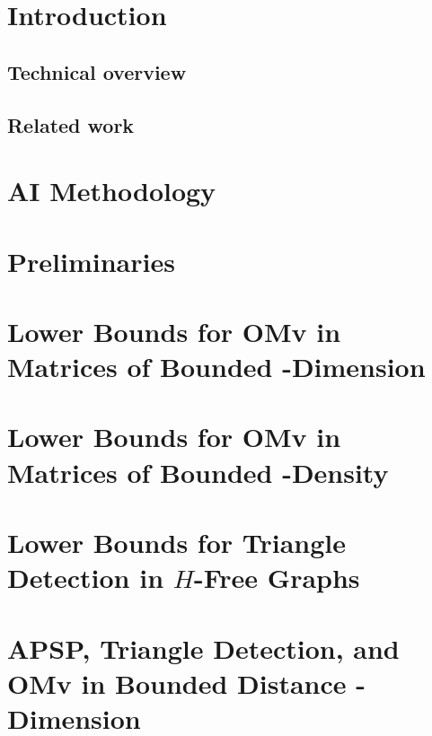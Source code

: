 \documentclass[11pt]{article}
\begin{document}
   \section{Introduction}
      \label{sec:intro}
      

      \subsection{Technical overview}
         

      \subsection{Related work}
         

   \section{AI Methodology}
      \label{sec:AI}
      

   \section{Preliminaries}
      \label{sec:preliminaries}
      

   \section{Lower Bounds for OMv in Matrices of Bounded \VC-Dimension}
      \label{sec:omv-lb}
      

   \section{Lower Bounds for OMv in Matrices of Bounded \VC-Density}
      \label{sec:density}
      

   \section{Lower Bounds for Triangle Detection in $H$-Free Graphs}
      \label{sec:triangle-lb}
      

   \section{APSP, Triangle Detection, and OMv in Bounded Distance \VC-Dimension}
      \label{sec:distance-vc}
      
\end{document}
